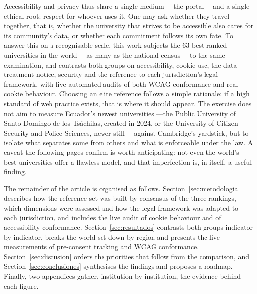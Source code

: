 \documentclass[pdflatex,sn-basic,Numbered]{sn-jnl}
\theoremstyle{thmstyleone}
\theoremstyle{thmstyletwo}
\theoremstyle{thmstylethree}
\begin{document}
Accessibility and privacy thus share a single medium ---the portal--- and a single ethical root: respect for whoever uses it. One may ask whether they travel together, that is, whether the university that strives to be accessible also cares for its community's data, or whether each commitment follows its own fate. To answer this on a recognisable scale, this work subjects the 63 best-ranked universities in the world ---as many as the national census--- to the same examination, and contrasts both groups on accessibility, cookie use, the data-treatment notice, security and the reference to each jurisdiction's legal framework, with live automated audits of both WCAG conformance and real cookie behaviour. Choosing an elite reference follows a simple rationale: if a high standard of web practice exists, that is where it should appear. The exercise does not aim to measure Ecuador's newest universities ---the Public University of Santo Domingo de los Tsáchilas, created in 2024, or the University of Citizen Security and Police Sciences, newer still--- against Cambridge's yardstick, but to isolate what separates some from others and what is enforceable under the law. A caveat the following pages confirm is worth anticipating: not even the world's best universities offer a flawless model, and that imperfection is, in itself, a useful finding.

The remainder of the article is organised as follows. Section~\ref{sec:metodologia} describes how the reference set was built by consensus of the three rankings, which dimensions were assessed and how the legal framework was adapted to each jurisdiction, and includes the live audit of cookie behaviour and of accessibility conformance. Section~\ref{sec:resultados} contrasts both groups indicator by indicator, breaks the world set down by region and presents the live measurements of pre-consent tracking and WCAG conformance. Section~\ref{sec:discusion} orders the priorities that follow from the comparison, and Section~\ref{sec:conclusiones} synthesises the findings and proposes a roadmap. Finally, two appendices gather, institution by institution, the evidence behind each figure.
\end{document}
